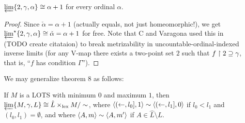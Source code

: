 \documentclass[11pt]{article}
\newcommand{\lexTimes}{\times_{\textrm{lex}}}
\begin{document}
  \begin{corollary}
    \(
      \varprojlim \{2, \gamma, \alpha\}
      \cong
      \alpha+1
    \)
    for every ordinal \(\alpha\).
  \end{corollary}

  \begin{proof}
    Since \(\check\alpha=\alpha+1\) (actually equals, not just homeomorphic!),
    we get \(\varprojlim^\star \{2, \gamma, \alpha\}
      \cong \check\alpha =
    \alpha+1\) for free.
    Note that C and Varagona used this in (TODO create citataion) to break
    metrizability in uncountable-ordinal-indexed inverse limits (for any V-map
    there exists a two-point set \(2\) such that \(f\restriction 2\supseteq\gamma\),
    that is, ``\(f\) has condition \(\Gamma\)'').
  \end{proof}

  \bigskip

  We may generalize theorem 8 as follows:

  \begin{theorem}
    If \(M\) is a LOTS with minimum \(0\) and maximum \(1\),
    then \(\varprojlim\{M,\gamma,L\}\cong \hat L\lexTimes M/\sim\),
    where \(\langle(\leftarrow,l_0],1\rangle\sim\langle(\leftarrow,l_1],0\rangle\) if
    \(l_0<l_1\) and \((l_0,l_1)=\emptyset\),
    and where \(\langle A,m\rangle\sim\langle A,m'\rangle\) if \(A\in\hat L\setminus L\).
  \end{theorem}
\end{document}
